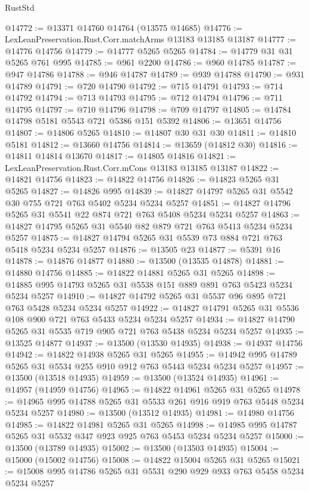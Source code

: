 \begin{lexlean}{RustStd}
\begin{coremodule}
@14772 := @13371 @14760 @14764 (@13575 @14685)
@14776 := LexLeanPreservation.Rust.Corr.matchArms @13183 @13185 @13187
@14777 := @14776 @14756
@14779 := @14777 @5265 @5265
@14784 := @14779 @31 @31 @5265 @761 @995
@14785 := @961 @2200
@14786 := @960 @14785
@14787 := @947 @14786
@14788 := @946 @14787
@14789 := @939 @14788
@14790 := @931 @14789
@14791 := @720 @14790
@14792 := @715 @14791
@14793 := @714 @14792
@14794 := @713 @14793
@14795 := @712 @14794
@14796 := @711 @14795
@14797 := @710 @14796
@14798 := @709 @14797
@14805 := @14784 @14798 @5181 @5543 @721 @5386 @151 @5392
@14806 := @13651 @14756
@14807 := @14806 @5265
@14810 := @14807 @30 @31 @30
@14811 := @14810 @5181
@14812 := @13660 @14756
@14814 := @13659 (@14812 @30)
@14816 := @14811 @14814 @13670
@14817 := @14805 @14816
@14821 := LexLeanPreservation.Rust.Corr.mCons @13183 @13185 @13187
@14822 := @14821 @14756
@14823 := @14822 @14756
@14826 := @14823 @5265 @31 @5265
@14827 := @14826 @995
@14839 := @14827 @14797 @5265 @31 @5542 @30 @755 @721 @763 @5402 @5234 @5234 @5257
@14851 := @14827 @14796 @5265 @31 @5541 @22 @874 @721 @763 @5408 @5234 @5234 @5257
@14863 := @14827 @14795 @5265 @31 @5540 @82 @879 @721 @763 @5413 @5234 @5234 @5257
@14875 := @14827 @14794 @5265 @31 @5539 @73 @884 @721 @763 @5418 @5234 @5234 @5257
@14876 := @13505 @23
@14877 := @5391 @16
@14878 := @14876 @14877
@14880 := @13500 (@13535 @14878)
@14881 := @14880 @14756
@14885 := @14822 @14881 @5265 @31 @5265
@14898 := @14885 @995 @14793 @5265 @31 @5538 @151 @889 @891 @763 @5423 @5234 @5234 @5257
@14910 := @14827 @14792 @5265 @31 @5537 @96 @895 @721 @763 @5428 @5234 @5234 @5257
@14922 := @14827 @14791 @5265 @31 @5536 @108 @900 @721 @763 @5433 @5234 @5234 @5257
@14934 := @14827 @14790 @5265 @31 @5535 @719 @905 @721 @763 @5438 @5234 @5234 @5257
@14935 := @13525 @14877
@14937 := @13500 (@13530 @14935)
@14938 := @14937 @14756
@14942 := @14822 @14938 @5265 @31 @5265
@14955 := @14942 @995 @14789 @5265 @31 @5534 @255 @910 @912 @763 @5443 @5234 @5234 @5257
@14957 := @13500 (@13518 @14935)
@14959 := @13500 (@13524 @14935)
@14961 := @14957 (@14959 @14756)
@14965 := @14822 @14961 @5265 @31 @5265
@14978 := @14965 @995 @14788 @5265 @31 @5533 @261 @916 @919 @763 @5448 @5234 @5234 @5257
@14980 := @13500 (@13512 @14935)
@14981 := @14980 @14756
@14985 := @14822 @14981 @5265 @31 @5265
@14998 := @14985 @995 @14787 @5265 @31 @5532 @347 @923 @925 @763 @5453 @5234 @5234 @5257
@15000 := @13500 (@13789 @14935)
@15002 := @13500 (@13503 @14935)
@15004 := @15000 (@15002 @14756)
@15008 := @14822 @15004 @5265 @31 @5265
@15021 := @15008 @995 @14786 @5265 @31 @5531 @290 @929 @933 @763 @5458 @5234 @5234 @5257

\end{coremodule}
\end{lexlean}
